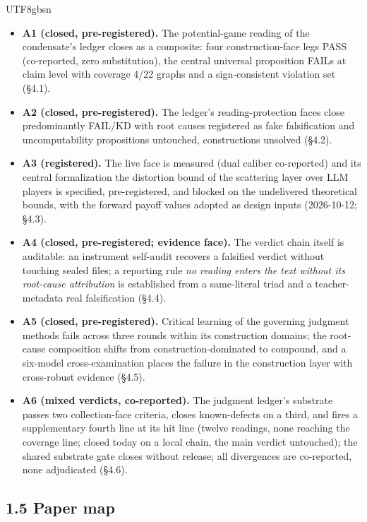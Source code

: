 \documentclass[11pt,letterpaper]{article}
\begin{document}
\begin{CJK}{UTF8}{gbsn}
\begin{itemize}
\item \textbf{A1 (closed, pre-registered).} The potential-game reading of the condensate's ledger closes as a composite: four construction-face legs PASS (co-reported, zero substitution), the central universal proposition FAILs at claim level with coverage 4/22 graphs and a sign-consistent violation set (\S{}4.1).
\item \textbf{A2 (closed, pre-registered).} The ledger's reading-protection faces close predominantly FAIL/KD with root causes registered as fake falsification and uncomputability \textemdash{} propositions untouched, constructions unsolved (\S{}4.2).
\item \textbf{A3 (registered).} The live face is measured (dual caliber co-reported) and its central formalization \textemdash{} the distortion bound of the scattering layer over LLM players \textemdash{} is specified, pre-registered, and blocked on the undelivered theoretical bounds, with the forward payoff values adopted as design inputs (2026-10-12; \S{}4.3).
\item \textbf{A4 (closed, pre-registered; evidence face).} The verdict chain itself is auditable: an instrument self-audit recovers a falsified verdict without touching sealed files; a reporting rule \textemdash{} \emph{no reading enters the text without its root-cause attribution} \textemdash{} is established from a same-literal triad and a teacher-metadata real falsification (\S{}4.4).
\item \textbf{A5 (closed, pre-registered).} Critical learning of the governing judgment methods fails across three rounds within its construction domains; the root-cause composition shifts from construction-dominated to compound, and a six-model cross-examination places the failure in the construction layer with cross-robust evidence (\S{}4.5).
\item \textbf{A6 (mixed verdicts, co-reported).} The judgment ledger's substrate passes two collection-face criteria, closes known-defects on a third, and fires a supplementary fourth line at its hit line (twelve readings, none reaching the coverage line; closed today on a local chain, the main verdict untouched); the shared substrate gate closes without release; all divergences are co-reported, none adjudicated (\S{}4.6).
\end{itemize}

\subsection*{1.5 Paper map}


\end{CJK}
\end{document}
